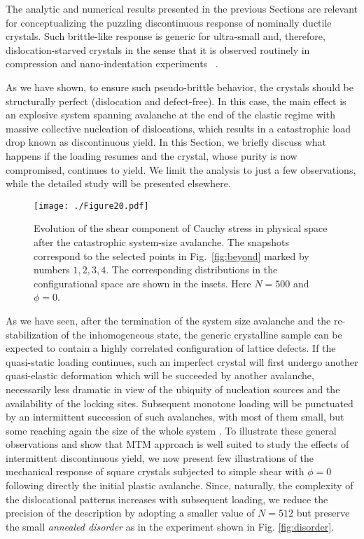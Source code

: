 \documentclass[CRPHYS,Unicode,manuscript]{cedram}
\begin{document}
The analytic and numerical results presented in the previous Sections are relevant for conceptualizing the puzzling discontinuous response of nominally ductile crystals. Such brittle-like response is generic for ultra-small and, therefore, dislocation-starved crystals in the sense that it is observed routinely in compression and nano-indentation experiments ~\cite{Corcoran1997-vt,Bei2007-vk,Chisholm2012-ki,wang2012pristine}.

As we have shown,  to ensure such pseudo-brittle behavior, the crystals should be structurally perfect (dislocation and defect-free). In this case, the main effect is an explosive system spanning avalanche at the end of the elastic regime with massive collective nucleation of dislocations, which results in a catastrophic load drop known as discontinuous yield. In this Section, we briefly discuss what happens if the loading resumes and the crystal, whose purity is now compromised, continues to yield. We limit the analysis to just a few observations, while the detailed study will be presented elsewhere.

\begin{figure}[h!]
\centering
\texttt{[image: ./Figure20.pdf]}
\caption{\scriptsize{Evolution of the shear component of Cauchy stress in physical space after the catastrophic system-size avalanche. The snapshots correspond to the selected points   in Fig.~\ref{fig:beyond}  marked by numbers  $1, 2, 3, 4$. The corresponding distributions in the configurational space  are shown in the insets. Here $N=500$ and $\phi=0$.}
 \label{fig:beyond2}}
\end{figure}
%  
%

As we have seen, after the termination of the system size avalanche and  the  re-stabilization of the inhomogeneous state, the  generic crystalline sample   can be expected to contain a highly correlated  configuration of lattice defects.  If the quasi-static loading continues,  such an imperfect crystal  will first undergo  another quasi-elastic deformation which will be succeeded  by another avalanche, necessarily less dramatic in view of the ubiquity  of   nucleation sources and the availability of   the  locking sites. Subsequent monotone  loading   will  be punctuated by an  intermittent succession of such avalanches,  with most of them  small,   but some   reaching again  the size of the whole system \cite{Friedman2012-ie,Zaiser2013-ff,Ispanovity2014-ra,Derlet2016-mp,Sethna2017-tm,Papanikolaou2017-ld,Cui2018-lq,Sparks2019-ie,Zhang2020-ax}.
To illustrate these general observations and show that MTM approach is well suited to study the  effects of intermittent discontinuous yield,  we now  present few illustrations of  the   mechanical response of square crystals subjected to simple shear with $\phi=0$  following directly the initial  plastic avalanche. Since, naturally,  the complexity of  the dislocational patterns  increases with subsequent loading,    we   reduce the precision of the description by  adopting  a smaller value of  $N=512$ but preserve the small \emph{annealed disorder} as in the experiment shown in Fig.  \ref{fig:disorder}. 
\end{document}
